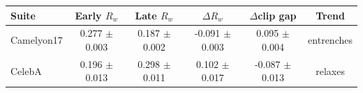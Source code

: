 \begin{tabular}{lccccc}
  \toprule
  Suite & Early $R_w$ & Late $R_w$ & $\Delta R_w$ & $\Delta$clip gap & Trend \\
  \midrule
  Camelyon17 & 0.277 $\pm$ 0.003 & 0.187 $\pm$ 0.002 & -0.091 $\pm$ 0.003 & 0.095 $\pm$ 0.004 & entrenches \\
  CelebA & 0.196 $\pm$ 0.013 & 0.298 $\pm$ 0.011 & 0.102 $\pm$ 0.017 & -0.087 $\pm$ 0.013 & relaxes \\
  \bottomrule
\end{tabular}
